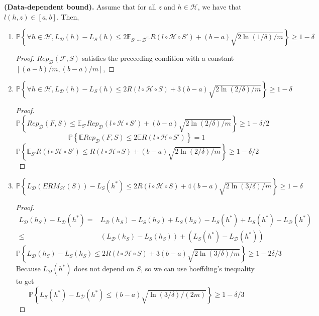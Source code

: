 \begin{theorem}
    \textbf{(Data-dependent bound).}
    Assume that for all $ z $ and $ h \in \mathcal{H} $, we have that $ l(h,z) \in [a, b] $. Then,
    \begin{enumerate}
        \item 
            \[
                \mathbb{P} \left\{ \forall h \in \mathcal{H}, L_ \mathcal{D}(h) - L_S (h) \le 2 \mathbb{E}_{S'\sim \mathcal{D}^m} R( l\circ \mathcal{H}\circ S') + (b-a) \sqrt{2\ln(1/\delta)/m} \right\} \ge 1-\delta
            \]
            \begin{proof}
                $ Rep_ \mathcal{D}( \mathcal{F}, S) $ satisfies the preceeding condition with a constant $ [(a-b)/m, (b-a)/m] $,
            \end{proof}
        \item  
            \[
                \mathbb{P} \left\{ \forall h \in \mathcal{H}, L_ \mathcal{D}(h) - L_S (h) \le 2 R( l\circ \mathcal{H}\circ S) + 3(b-a) \sqrt{2 \ln(2/\delta)/m} \right\} \ge 1-\delta
            \]
            \begin{proof}
                \[
                    \mathbb{P} \left\{ Rep_ \mathcal{D}(F, S) \le \mathbb{E}_{S'} Rep_ \mathcal{D}( l\circ \mathcal{H}\circ S') + (b-a) \sqrt{2 \ln(2/\delta)/m} \right\} \ge 1-\delta/2
                \]
                \[
                    \mathbb{P} \left\{ \mathbb{E}Rep_ \mathcal{D}(F, S) \le 2 \mathbb{E}R(l\circ \mathcal{H}\circ S') \right\} = 1
                \]
                \[
                    \mathbb{P} \left\{ \mathbb{E}_{S'} R( l\circ \mathcal{H}\circ S') \le R( l\circ \mathcal{H} \circ S) + (b-a) \sqrt{2 \ln(2/\delta)/m} \right\} \ge 1-\delta/2
                \]
            \end{proof}
        \item 
            \[
                \mathbb{P} \left\{ L_ \mathcal{D}(ERM_ \mathcal{H}(S)) - L_S (h^*) \le 2 R( l\circ \mathcal{H}\circ S) + 4(b-a) \sqrt{2 \ln(3/\delta)/m} \right\} \ge 1-\delta
            \]
            \begin{proof}
                \begin{align*}
                    L_ \mathcal{D}(h_S) - L_ \mathcal{D}(h^*)
                    =& L_ \mathcal{D}(h_S) - L_S(h_S) + L_S(h_S) - L_S(h^*) + L_S(h^*) - L_ \mathcal{D}(h^*)\\
                    \le& (L_ \mathcal{D}(h_S) - L_S(h_S)) + (L_S(h^*) - L_ \mathcal{D}(h^*))
                \end{align*}
            \[
                \mathbb{P} \left\{ L_ \mathcal{D}(h_S) - L_S (h_S) \le 2 R( l\circ \mathcal{H}\circ S) + 3(b-a) \sqrt{2 \ln(3/\delta)/m} \right\} \ge 1-2\delta/3
            \]
            Because $ L_ \mathcal{D}(h^*) $ does not depend on $ S $, so we can use hoeffding's inequality to get 
            \[
                \mathbb{P} \left\{ L_S(h^*) - L_ \mathcal{D}(h^*) \le (b-a) \sqrt{ {\ln(3/\delta)}/{(2m)} } \right\} \ge 1-\delta/3
            \]
            \end{proof}
    \end{enumerate}
\end{theorem}

